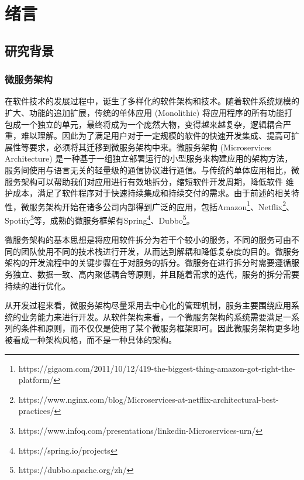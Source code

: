 \documentclass[macfonts,master]{njuthesis}
\begin{document}
\chapter{绪言}\label{chapter_introduction}

\section{研究背景}
\subsection{微服务架构}
在软件技术的发展过程中，诞生了多样化的软件架构和技术。随着软件系统规模的扩大、功能的追加扩展，传统的单体应用 (Monolithic) 将应用程序的所有功能打包成一个独立的单元，最终将成为一个庞然大物，变得越来越复杂，逻辑耦合严重，难以理解。因此为了满足用户对于一定规模的软件的快速开发集成、提高可扩展性等要求，必须将其迁移到微服务架构中来\cite{bucchiarone2018monolithic,taibi2017processes,al2018comparative,马晓星2019软件开发方法发展回顾与展望}。微服务架构 (Microservices Architecture) 是一种基于一组独立部署运行的小型服务来构建应用的架构方法，服务间使用与语言无关的轻量级的通信协议进行通信\cite{Microservices,dragoni2017microservices}。与传统的单体应用相比，微服务架构可以帮助我们对应用进行有效地拆分，缩短软件开发周期，降低软件 维护成本，满足了软件程序对于快速持续集成和持续交付的需求\cite{balalaie2016microservices,taibi2018architectural}。由于前述的相关特性，微服务架构开始在诸多公司内部得到广泛的应用，包括Amazon\footnote{https://gigaom.com/2011/10/12/419-the-biggest-thing-amazon-got-right-the-platform/}、Netflix\footnote{https://www.nginx.com/blog/Microservices-at-netflix-architectural-best-practices/}、Spotify\footnote{https://www.infoq.com/presentations/linkedin-Microservices-urn/}等，成熟的微服务框架有Spring\footnote{https://spring.io/projects}、Dubbo\footnote{https://dubbo.apache.org/zh/}。

微服务架构的基本思想是将应用软件拆分为若干个较小的服务，不同的服务可由不同的团队使用不同的技术栈进行开发，从而达到解耦和降低复杂度的目的\cite{Microservices}。微服务架构的开发流程中的关键步骤在于对服务的拆分。微服务在进行拆分时需要遵循服务独立、数据一致、高内聚低耦合等原则，并且随着需求的迭代，服务的拆分需要持续的进行优化。

从开发过程来看，微服务架构尽量采用去中心化的管理机制，服务主要围绕应用系统的业务能力来进行开发。从软件架构来看，一个微服务架构的系统需要满足一系列的条件和原则，而不仅仅是使用了某个微服务框架即可。因此微服务架构更多地被看成一种架构风格，而不是一种具体的架构。
\end{document}
